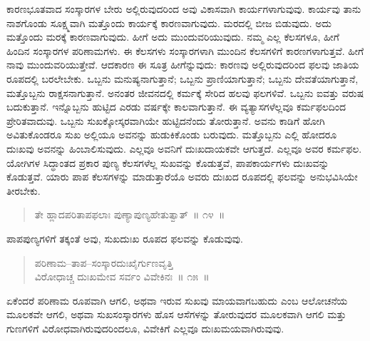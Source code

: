 ಕಾರಣಭೂತವಾದ ಸಂಸ್ಕಾರಗಳ ಬೇರು ಅಲ್ಲಿರುವುದರಿಂದ ಅವು ವಿಕಾಸವಾಗಿ ಕಾರ್ಯಗಳಾಗುವುವು. ಕಾರ್ಯವು ತಾನು ನಾಶಗೊಂಡು ಸೂಕ್ಷ್ಮವಾಗಿ ಮತ್ತೊಂದು ಕಾರ್ಯಕ್ಕೆ ಕಾರಣವಾಗುವುದು. ಮರದಲ್ಲಿ ಬೀಜ ಬಿಡುವುದು. ಅದು ಮತ್ತೊಂದು ಮರಕ್ಕೆ ಕಾರಣವಾಗುವುದು. ಹೀಗೆ ಅದು ಮುಂದುವರಿಯುವುದು. ನಮ್ಮ ಎಲ್ಲ ಕೆಲಸಗಳೂ, ಹೀಗೆ ಹಿಂದಿನ ಸಂಸ್ಕಾರಗಳ ಪರಿಣಾಮಗಳು. ಈ ಕೆಲಸಗಳು ಸಂಸ್ಕಾರಗಳಾಗಿ ಮುಂದಿನ ಕೆಲಸಗಳಿಗೆ ಕಾರಣಗಳಾಗುತ್ತವೆ. ಹೀಗೆ ನಾವು ಮುಂದುವರಿಯುತ್ತೇವೆ. ಆದಕಾರಣ ಈ ಸೂತ್ರ ಹೀಗೆನ್ನುವುದು: ಕಾರಣವು ಅಲ್ಲಿರುವುದರಿಂದ ಫಲವು ಜಾತಿಯ ರೂಪದಲ್ಲಿ ಬರಲೇಬೇಕು. ಒಬ್ಬನು ಮನುಷ್ಯನಾಗುತ್ತಾನೆ; ಒಬ್ಬನು ಪ್ರಾಣಿಯಾಗುತ್ತಾನೆ; ಒಬ್ಬನು ದೇವತೆಯಾಗುತ್ತಾನೆ, ಮತ್ತೊಬ್ಬನು ರಾಕ್ಷಸನಾಗುತ್ತಾನೆ. ಅನಂತರ ಜೀವನದಲ್ಲಿ ಕರ್ಮಕ್ಕೆ ಸೇರಿದ ಹಲವು ಫಲಗಳಿವೆ. ಒಬ್ಬನು ಐವತ್ತು ವರುಷ ಬದುಕುತ್ತಾನೆ. ಇನ್ನೊಬ್ಬನು ಹುಟ್ಟಿದ ಎರಡು ವರ್ಷಕ್ಕೇ ಕಾಲವಾಗುತ್ತಾನೆ. ಈ ವ್ಯತ್ಯಾಸಗಳೆಲ್ಲವೂ ಕರ್ಮಫಲದಿಂದ ಪ್ರೇರಿತವಾದುವು. ಒಬ್ಬನು ಸುಖಕ್ಕೋಸ್ಕರವಾಗಿಯೇ ಹುಟ್ಟಿದನೆಂದು ತೋರುತ್ತಾನೆ. ಅವನು ಕಾಡಿಗೆ ಹೋಗಿ ಅವಿತುಕೊಂಡರೂ ಸುಖ ಅಲ್ಲಿಯೂ ಅವನನ್ನು ಹುಡುಕಿಕೊಂಡು ಬರುವುದು. ಮತ್ತೊಬ್ಬನು ಎಲ್ಲಿ ಹೋದರೂ ದುಃಖವು ಅವನನ್ನು ಹಿಂಬಾಲಿಸುವುದು. ಎಲ್ಲವೂ ಅವನಿಗೆ ದುಃಖದಾಯಕವೇ ಆಗುತ್ತದೆ. ಎಲ್ಲವೂ ಅವರ ಕರ್ಮಫಲ. ಯೋಗಿಗಳ ಸಿದ್ಧಾಂತದ ಪ್ರಕಾರ ಪುಣ್ಯ ಕೆಲಸಗಳೆಲ್ಲ ಸುಖವನ್ನು ಕೊಡುತ್ತವೆ, ಪಾಪಕಾರ್ಯಗಳು ದುಃಖವನ್ನು ಕೊಡುತ್ತವೆ. ಯಾರು ಪಾಪ ಕೆಲಸಗಳನ್ನು ಮಾಡುತ್ತಾರೆಯೊ ಅವರು ದುಃಖದ ರೂಪದಲ್ಲಿ ಫಲವನ್ನು ಅನುಭವಿಸಿಯೇ ತೀರಬೇಕು. 


\begin{verse}
ತೇ ಹ್ಲಾದಪರಿತಾಪಫಲಾಃ ಪುಣ್ಯಾಪುಣ್ಯಹೇತುತ್ವಾತ್​~॥ ೧೪~॥
\end{verse}


ಪಾಪಪುಣ್ಯಗಳಿಗೆ ತಕ್ಕಂತೆ ಅವು, ಸುಖದುಃಖ ರೂಪದ ಫಲವನ್ನು ಕೊಡುವುವು. 


\begin{verse}
ಪರಿಣಾಮ–ತಾಪ–ಸಂಸ್ಕಾರದುಃಖೈರ್ಗುಣವೃತ್ತಿ\\ವಿರೋಧಾಚ್ಚ ದುಃಖಮೇವ ಸರ್ವಂ ವಿವೇಕಿನಃ~॥ ೧೫~॥
\end{verse}


ಏಕೆಂದರೆ ಪರಿಣಾಮ ರೂಪವಾಗಿ ಆಗಲಿ, ಅಥವಾ ಇರುವ ಸುಖವು ಮಾಯವಾಗಬಹುದು ಎಂಬ ಆಲೋಚನೆಯ ಮೂಲಕವೇ ಆಗಲಿ, ಅಥವಾ ಸುಖಸಂಸ್ಕಾರಗಳು ಹೊಸ ಆಸೆಗಳನ್ನು ತೋರುವುದರ ಮೂಲಕವಾಗಿ ಆಗಲಿ ಮತ್ತು ಗುಣಗಳಿಗೆ ವಿರೋಧವಾಗಿರುವುದರಿಂದಲೂ, ವಿವೇಕಿಗೆ ಎಲ್ಲವೂ ದುಃಖಮಯವಾಗಿರುವುವು. 

